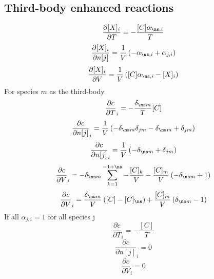 \documentclass[a4paper,10pt]{article}
\begin{document}
\subsection{Third-body enhanced reactions}
\begin{dmath} \frac{\partial [X]_i }{\partial T } = - \frac{[C] \alpha_{\ns,i}}{T}\end{dmath} 
\begin{dmath} \frac{\partial [X]_i }{\partial n[j] } = \frac{1}{V} \left(- \alpha_{\ns,i} + \alpha_{j,i}\right)\end{dmath} 
\begin{dmath} \frac{\partial [X]_i }{\partial V } = \frac{1}{V} \left([C] \alpha_{\ns,i} - [X]_{i}\right)\end{dmath} 
For species $m$ as the third-body
\begin{dmath} \frac{\partial c }{\partial T }_{i} = - \frac{\delta_{\ns m}}{T} [C]\end{dmath} 
\begin{dmath} \frac{\partial c }{\partial n[j] }_{i} = \frac{1}{V} \left(- \delta_{\ns m} \delta_{j m} - \delta_{\ns m} + \delta_{j m}\right)\end{dmath} 
\begin{dmath} \frac{\partial c }{\partial n[j] }_{i} = \frac{1}{V} \left(- \delta_{\ns m} + \delta_{j m}\right)\end{dmath} 
\begin{dmath} \frac{\partial c }{\partial V }_{i} = - \delta_{\ns m} \sum_{k=1}^{-1 + \ns} - \frac{[C]_{k}}{V} - \frac{[C]_{m}}{V} \left(- \delta_{\ns m} + 1\right)\end{dmath} 
\begin{dmath} \frac{\partial c }{\partial V }_{i} = \frac{\delta_{\ns m}}{V} \left([C] - [C]_{\ns}\right) + \frac{[C]_{m}}{V} \left(\delta_{\ns m} - 1\right)\end{dmath} 
If all $\alpha_{j, i} = 1$ for all species j
\begin{dmath} \frac{\partial c }{\partial T }_{i} = - \frac{[C]}{T}\end{dmath} 
\begin{dmath} \frac{\partial c }{\partial n[j] }_{i} = 0\end{dmath} 
\begin{dmath} \frac{\partial c }{\partial V }_{i} = 0\end{dmath} 
\end{document}
